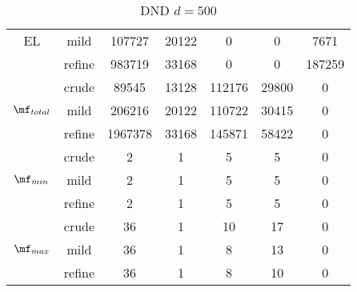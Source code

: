 \begin{table}[htb]
\begin{tabular}{ |c|c|c|c|c|c|c| }
 EL  & mild & 107727 & 20122 & 0 & 0 & 7671 \\
  & refine & 983719 & 33168 & 0 & 0 & 187259 \\
\hline
  & crude & 89545 & 13128 & 112176 & 29800 & 0 \\
 $\mf_{total}$  & mild & 206216 & 20122 & 110722 & 30415 & 0 \\
  & refine & 1967378 & 33168 & 145871 & 58422 & 0 \\
\hline
  & crude & 2 & 1 & 5 & 5 & 0 \\
 $\mf_{min}$  & mild & 2 & 1 & 5 & 5 & 0 \\
  & refine & 2 & 1 & 5 & 5 & 0 \\
\hline
  & crude & 36 & 1 & 10 & 17 & 0 \\
 $\mf_{max}$  & mild & 36 & 1 & 8 & 13 & 0 \\
  & refine & 36 & 1 & 8 & 10 & 0 \\
\hline
\end{tabular}
\caption{ DND $d=500$ }
\end{table}
